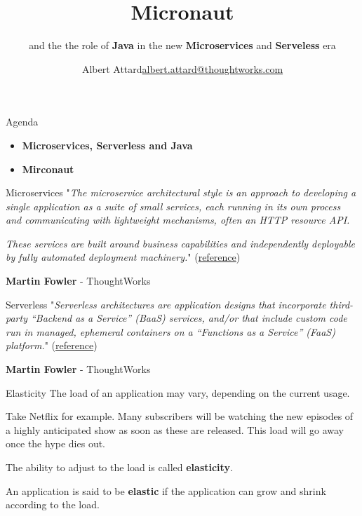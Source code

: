 \documentclass{beamer}
\title[Micronaut]{Micronaut}
\subtitle{and the the role of \textbf{Java} in the new \textbf{Microservices} and \textbf{Serveless} era}
\author{\texorpdfstring{Albert Attard\newline\url{albert.attard@thoughtworks.com}}{Albert Attard}}
\institute{\large \href{https://thoughtworks.com}{\textbf{ThoughtWorks}.com}}
\date{}
\begin{document}

  \begin{frame}
    \titlepage
  \end{frame}


  \begin{frame}[t]{Agenda}
    \begin{itemize}
      \item \textbf{Microservices, Serverless and Java}
      \item \textbf{Mirconaut}
    \end{itemize}
  \end{frame}


  \begin{frame}[t]{Microservices}
    "\textit{The microservice architectural style is an approach to developing a single application as a suite of small services, each running in its own process and communicating with lightweight mechanisms, often an HTTP resource API.}

    \textit{These services are built around business capabilities and independently deployable by fully automated deployment machinery.}" (\href{https://martinfowler.com/articles/microservices.html}{reference})

    \textbf{Martin Fowler} - ThoughtWorks
  \end{frame}


  \begin{frame}[t]{Serverless}
    "\textit{Serverless architectures are application designs that incorporate third-party “Backend as a Service” (BaaS) services, and/or that include custom code run in managed, ephemeral containers on a “Functions as a Service” (FaaS) platform.}" (\href{https://martinfowler.com/articles/serverless.html}{reference})

    \textbf{Martin Fowler} - ThoughtWorks
  \end{frame}


  \begin{frame}[t]{Elasticity}
    The load of an application may vary, depending on the current usage.

    Take Netflix for example. Many subscribers will be watching the new episodes of a highly anticipated show as soon as these are released. This load will go away once the hype dies out.

    The ability to adjust to the load is called \textbf{elasticity}.

    An application is said to be \textbf{elastic} if the application can grow and shrink according to the load.
  \end{frame}
\end{document}
